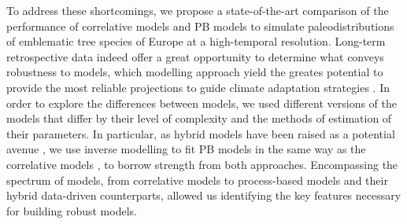 To address these shortcomings, we propose a state-of-the-art comparison of the performance of correlative models and PB models to simulate paleodistributions of emblematic tree species of Europe at a high-temporal resolution. Long-term retrospective data indeed offer a great opportunity to determine what conveys robustness to models, which modelling approach yield the greates potential to provide the most reliable projections to guide climate adaptation strategies \cite{Fordham2016}. In order to  explore the differences between models, we used different versions of the models that differ by their level of complexity and the methods of estimation of their parameters. In particular, as hybrid models have been raised as a potential avenue \cite{Higgins2012, Dormann2012, Evans2016}, we use inverse modelling to fit PB models in the same way as the correlative models \cite{VanderMeersch2023}, to borrow strength from both approaches. Encompassing the spectrum of models, from correlative models to process-based models and their hybrid data-driven counterparts, allowed us identifying the key features necessary for building robust  models.